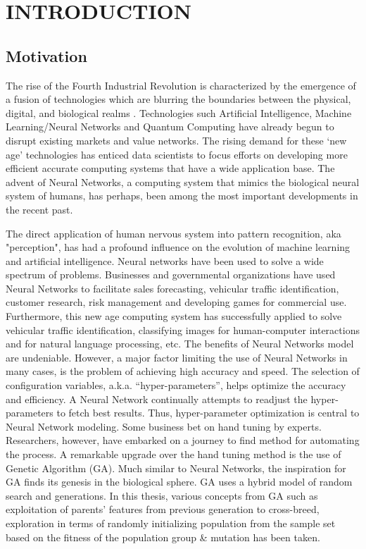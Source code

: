 \chapter{INTRODUCTION}

\section{Motivation}

The rise of the Fourth Industrial Revolution is characterized by the emergence of a fusion of technologies which are blurring the boundaries between the physical, digital, and biological realms \cite{schwab20164th}. Technologies such Artificial Intelligence, Machine Learning/Neural Networks and Quantum Computing have already begun to disrupt existing markets and value networks. The rising demand for these ‘new age’ technologies has enticed data scientists to focus efforts on developing more efficient accurate computing systems that have a wide application base. The advent of Neural Networks, a computing system that mimics the biological neural system of humans\cite{lippmann1987introduction}, has perhaps, been among the most important developments in the recent past.

The direct application of human nervous system into pattern recognition, aka "perception", has had a profound influence on the evolution of machine learning and artificial intelligence. Neural networks have been used to solve a wide spectrum of problems. Businesses and governmental organizations have used Neural Networks to facilitate sales forecasting, vehicular traffic identification, customer research, risk management and developing games for commercial use. Furthermore, this new age computing system has successfully applied to solve vehicular traffic identification, classifying images for human-computer interactions and for natural language processing, etc. 
The benefits of Neural Networks model are undeniable. However, a major factor limiting the use of Neural Networks in many cases, is the problem of achieving high accuracy and speed. The selection of configuration variables, a.k.a. “hyper-parameters”, helps optimize the accuracy and efficiency. A Neural Network continually attempts to readjust the hyper-parameters to fetch best results. Thus, hyper-parameter optimization is central to Neural Network modeling. Some business bet on hand tuning by experts. Researchers, however, have embarked on a journey to find method for automating the process.
A remarkable upgrade over the hand tuning method is the use of Genetic Algorithm (GA). Much similar to Neural Networks, the inspiration for GA finds its genesis in the biological sphere. GA uses a hybrid model of random search and generations. In this thesis, various concepts from GA such as exploitation of parents' features from previous generation to cross-breed, exploration in terms of randomly initializing population from the sample set based on the fitness of the population group \& mutation has been taken.

